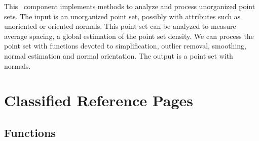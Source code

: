 


This \cgal\ component implements methods to analyze and process unorganized point sets. The input is an unorganized point set, possibly with attributes such as unoriented or oriented normals.
This point set can be analyzed to measure average spacing, a global estimation of the point set density. We can process the point set with functions devoted to simplification, outlier removal, smoothing, normal estimation and normal orientation. The output is a point set with normals.

\section{Classified Reference Pages}

\subsection{Functions}

  \\
  \\
  \\
  \\
  \\
  \\
  \\
  \\
  \\
  \\
  \\
  \\

